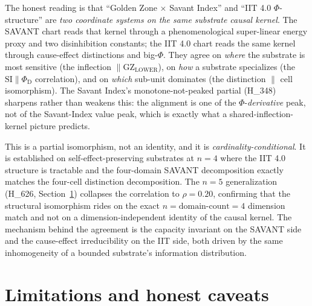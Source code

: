 \documentclass[11pt,a4paper]{article}
\newcommand{\GZL}{\mathrm{GZ_{LOWER}}}
\newcommand{\Svi}{\mathrm{SI}}
\newcommand{\PhiD}{\Phi_{\mathrm{D}}}
\begin{document}
The honest reading is that ``Golden Zone $\times$ Savant Index'' and
``IIT 4.0 $\Phi$-structure'' are \emph{two coordinate systems on the same
substrate causal kernel}. The SAVANT chart reads that kernel through a
phenomenological super-linear energy proxy and two disinhibition
constants; the IIT 4.0 chart reads the same kernel through cause-effect
distinctions and big-$\Phi$. They agree on \emph{where} the substrate is
most sensitive (the inflection $\parallel \GZL$), on \emph{how} a
substrate specializes (the $\Svi \parallel \PhiD$ correlation), and on
\emph{which} sub-unit dominates (the distinction $\parallel$ cell
isomorphism). The Savant Index's monotone-not-peaked partial (H\_348)
sharpens rather than weakens this: the alignment is one of the
$\Phi$-\emph{derivative} peak, not of the Savant-Index value peak, which is
exactly what a shared-inflection-kernel picture predicts.

This is a partial isomorphism, not an identity, and it is
\emph{cardinality-conditional}. It is established on
self-effect-preserving substrates at $n=4$ where the IIT 4.0 structure is
tractable and the four-domain SAVANT decomposition exactly matches the
four-cell distinction decomposition. The $n=5$ generalization (H\_626,
Section~\ref{sec:limits}) collapses the correlation to $\rho=0.20$,
confirming that the structural isomorphism rides on the exact
$n=\text{domain-count}=4$ dimension match and not on a
dimension-independent identity of the causal kernel. The mechanism behind the agreement is
the capacity invariant on the SAVANT side and the cause-effect irreducibility
on the IIT side, both driven by the same inhomogeneity of a bounded
substrate's information distribution.

\section{Limitations and honest caveats}
\label{sec:limits}
\end{document}
